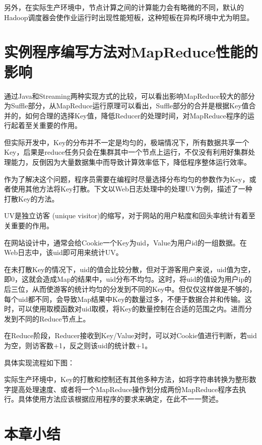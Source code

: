 另外，在实际生产环境中，节点计算之间的计算能力会有略微的不同，默认的Hadoop调度器会使作业运行时出现性能短板，这种短板在异构环境中尤为明显。

\section{实例程序编写方法对MapReduce性能的影响}
通过Java和Streaming两种实现方式的比较，可以看出影响MapReduce较大的部分为Suffle部分，从MapReduce运行原理可以看出，Suffle部分的合并是根据Key值合并的，如何合理的选择Key值，降低Reducer的处理时间，对MapReduce程序的运行起着至关重要的作用。

但实际开发中，Key的分布并不一定是均匀的，极端情况下，所有数据共享一个Key，后果是reduce任务只会在集群其中一个节点上运行，不仅没有利用好集群处理能力，反倒因为大量数据集中而导致计算效率低下，降低程序整体运行效率。

作为了解决这个问题，程序员需要在编程时尽量选择分布均匀的参数作为Key，或者使用其他方法将Key打散。下文以Web日志处理中的处理UV为例，描述了一种打散Key的方法。

UV是独立访客 (unique visitor)的缩写，对于网站的用户粘度和回头率统计有着至关重要的作用。

在网站设计中，通常会给Cookie一个Key为uid，Value为用户id的一组数据。在Web日志中，该uid即可用来统计UV。

在未打散Key的情况下，uid的值会比较分散，但对于游客用户来说，uid值为空，即0，这就会造成Map的结果中，uid分布不均匀。这时，将uid的值设为用户ip的后三位，从而使游客的统计均匀的分发到不同的Key中。但仅仅这样做是不够的，每个uid都不同，会导致Map结果中Key的数量过多，不便于数据合并和传输。这时，可以使用取模函数对uid取模，将Key的数量控制在合适的范围之内。进而分发到不同的Reduce节点上。

在Reduce阶段，Reducer接收到Key/Value对时，可以对Cookie值进行判断，若uid为空，则访客数+1，反之则该uid的统计数+1。

具体实现流程如下图：

实际生产环境中，Key的打散和控制还有其他多种方法，如将字符串转换为整形数字提高处理速度、或者将一个MapReduce操作划分成两份MapReduce程序去执行。具体使用方法应该根据应用程序的要求来确定，在此不一一赘述。

\section{本章小结}